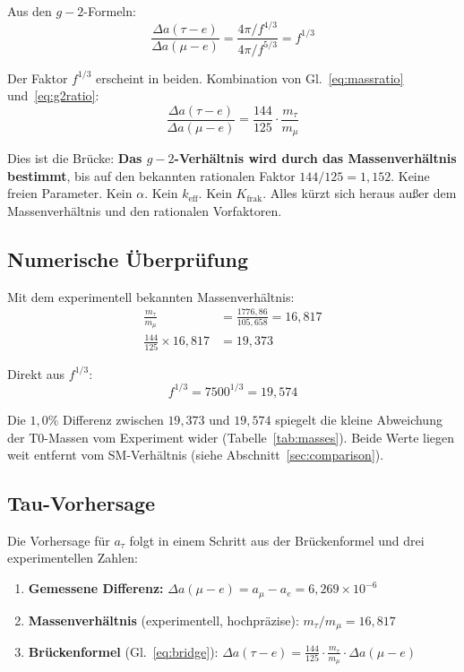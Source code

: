 Aus den $g-2$-Formeln:
\begin{equation}
	\frac{\Delta a(\tau{-}e)}{\Delta a(\mu{-}e)} 
	= \frac{4\pi/f^{4/3}}{4\pi/f^{5/3}} = f^{1/3}
	\label{eq:g2ratio}
\end{equation}

Der Faktor $f^{1/3}$ erscheint in beiden. Kombination von Gl.~\ref{eq:massratio} und~\ref{eq:g2ratio}:
\begin{equation}
	\boxed{\frac{\Delta a(\tau{-}e)}{\Delta a(\mu{-}e)} = \frac{144}{125} \cdot \frac{m_\tau}{m_\mu}}
	\label{eq:bridge}
\end{equation}

Dies ist die Brücke: \textbf{Das $g-2$-Verhältnis wird durch das Massenverhältnis bestimmt}, bis auf den bekannten rationalen Faktor $144/125 = 1{,}152$. Keine freien Parameter. Kein $\alpha$. Kein $k_\text{eff}$. Kein $K_\text{frak}$. Alles kürzt sich heraus außer dem Massenverhältnis und den rationalen Vorfaktoren.

\subsection{Numerische Überprüfung}

Mit dem experimentell bekannten Massenverhältnis:
\begin{align}
	\frac{m_\tau}{m_\mu} &= \frac{1776{,}86}{105{,}658} = 16{,}817 \\
	\frac{144}{125} \times 16{,}817 &= 19{,}373
\end{align}

Direkt aus $f^{1/3}$:
\begin{equation}
	f^{1/3} = 7500^{1/3} = 19{,}574
\end{equation}

Die $1{,}0\%$ Differenz zwischen $19{,}373$ und $19{,}574$ spiegelt die kleine Abweichung der T0-Massen vom Experiment wider (Tabelle~\ref{tab:masses}). Beide Werte liegen weit entfernt vom SM-Verhältnis (siehe Abschnitt~\ref{sec:comparison}).

\subsection{Tau-Vorhersage}

Die Vorhersage für $a_\tau$ folgt in einem Schritt aus der Brückenformel und drei experimentellen Zahlen:

\begin{enumerate}
	\item \textbf{Gemessene Differenz:} $\Delta a(\mu{-}e) = a_\mu - a_e = 6{,}269 \times 10^{-6}$
	\item \textbf{Massenverhältnis} (experimentell, hochpräzise): $m_\tau/m_\mu = 16{,}817$
	\item \textbf{Brückenformel} (Gl.~\ref{eq:bridge}): $\Delta a(\tau{-}e) = \frac{144}{125} \cdot \frac{m_\tau}{m_\mu} \cdot \Delta a(\mu{-}e)$
\end{enumerate}

